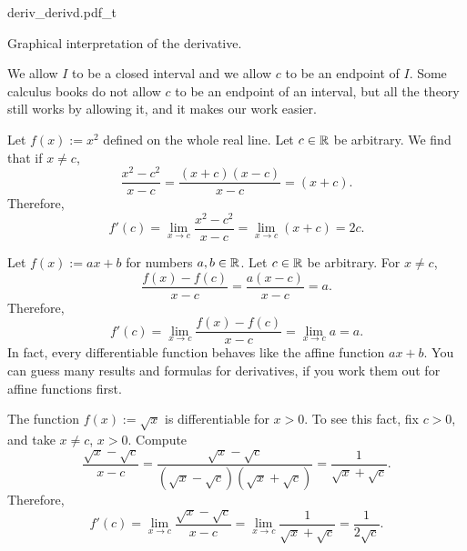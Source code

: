 \begin{myfigureht}
{deriv_derivd.pdf_t}
\caption{Graphical interpretation of the derivative.\label{derivfig}}
\end{myfigureht}

We allow $I$ to be a closed interval and we allow
$c$ to be an endpoint of $I$.  Some calculus books do not allow $c$ to be an
endpoint of an interval, but all the theory still works by allowing it, and
it makes our work easier.

\begin{example}
Let $f(x) := x^2$ defined on the whole real line.  Let $c \in {\mathbb{R}}$ be arbitrary.  We find that if
$x \not=c$,
\begin{equation*}
\frac{x^2-c^2}{x-c} =
\frac{(x+c)(x-c)}{x-c} =
(x+c) .
\end{equation*}
Therefore,
\begin{equation*}
f'(c) = 
\lim_{x\to c} \frac{x^2-c^2}{x-c} =
\lim_{x\to c} (x+c) = 2c.
\end{equation*}
\end{example}

\begin{example}
Let $f(x) := ax + b$ for numbers $a, b \in {\mathbb{R}}$.
Let $c \in {\mathbb{R}}$ be arbitrary.
For $x \not=c$,
\begin{equation*}
\frac{f(x)-f(c)}{x-c} =
\frac{a(x-c)}{x-c} = a .
\end{equation*}
Therefore,
\begin{equation*}
f'(c) =
\lim_{x\to c} 
\frac{f(x)-f(c)}{x-c} =
\lim_{x\to c} 
a = a.
\end{equation*}
In fact, every differentiable function  behaves like
the affine function $ax + b$.  You can guess many results
and formulas for derivatives, if you work them out for affine functions
first.
\end{example}

\begin{example}
The function $f(x) := \sqrt{x}$ is differentiable for $x > 0$.  To see this
fact, fix $c > 0$,
and take $x \not= c$, $x > 0$.  Compute
\begin{equation*}
\frac{\sqrt{x}-\sqrt{c}}{x-c}
=
\frac{\sqrt{x}-\sqrt{c}}{(\sqrt{x}-\sqrt{c})(\sqrt{x}+\sqrt{c})}
=
\frac{1}{\sqrt{x}+\sqrt{c}} .
\end{equation*}
Therefore,
\begin{equation*}
f'(c) =
\lim_{x\to c}
\frac{\sqrt{x}-\sqrt{c}}{x-c}
=
\lim_{x\to c}
\frac{1}{\sqrt{x}+\sqrt{c}}
=
\frac{1}{2\sqrt{c}} .
\end{equation*}
\end{example}

